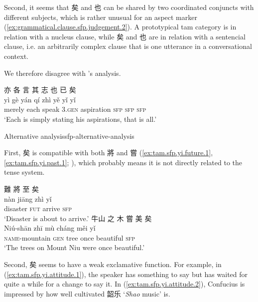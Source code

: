 \documentclass[UTF8, a4paper, oneside, scheme=plain, 12pt]{ctexrep}
\newcommand{\form}[1]{\emph{#1}}
\newcommand{\translate}[1]{`#1'}
\newcommand*{\category}[1]{\textsc{#1}}
\begin{document}
Second, it seems that 矣 and 也 can be shared by two coordinated conjuncts with different subjects,
which is rather unusual for an aspect marker (\ref{ex:grammatical.clause.sfp.judgement.2}).
A prototypical \ac{tam} category is in relation with a nucleus clause,
while 矣 and 也 are in relation with a sentencial clause,
i.e. an arbitrarily complex clause that is one utterance in a conversational context.


We therefore disagree with \citet{meiguang2018}'s analysis.



\begin{exe}
    \ex
    \glll 亦 各 言 其 志 也 已 矣 \\
    yì gè yán qí zhì yě yǐ yǐ \\
    merely each speak 3.\category{gen} aspiration \category{sfp} \category{sfp} \category{sfp} \\
    \glt\translate{Each is simply stating his aspirations, that is all.}
\end{exe}

\begin{infobox}{Alternative analysis}{sfp-alternative-analysis}
    
\end{infobox}

First, 矣 is compatible with both 將 and 嘗 (\ref{ex:tam.sfp.yi.future.1}, \ref{ex:tam.sfp.yi.past.1}; ), which probably means it is not directly related to the tense system.

\begin{exe}
    \ex\label{ex:tam.sfp.yi.future.1}
    \glll 難 將 至 矣 \\
    nàn jiāng zhì yǐ \\
    disaster \category{fut} arrive \category{sfp} \\
    \glt\translate{Disaster is about to arrive.}
    \ex\label{ex:tam.sfp.yi.past.1}
    \glll 牛山 之 木 嘗 美 矣 \\
    Niú-shān zhī mù cháng měi yǐ \\
    \category{name}-mountain \category{gen} tree once beautiful \category{sfp} \\
    \glt\translate{The trees on Mount Niu were once beautiful.}
\end{exe}

Second, 矣 seems to have a weak exclamative function.
For example, in (\ref{ex:tam.sfp.yi.attitude.1}),
the speaker has something to say but has waited for quite a while for a change to say it.
In (\ref{ex:tam.sfp.yi.attitude.2}),
Confucius is impressed by how well cultivated 韶乐 \translate{\form{Shao} music} is.
\end{document}
